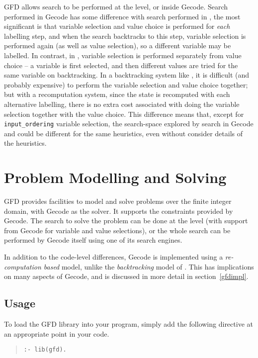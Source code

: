 GFD allows search to be performed at the \eclipse level, or inside Gecode. 
Search performed in Gecode has some difference with search performed in
\eclipse, the most significant is that variable selection and value choice is 
performed for 
{\it each\/} labelling step, and when the search backtracks to this step, 
variable selection is performed again (as well as value selection), 
so a different variable may be labelled. In contrast, in \eclipse, variable
selection is performed separately from value choice -- a variable is first
selected, and then different values are tried for the same variable on 
backtracking. In a backtracking system like \eclipse, it is 
difficult (and probably expensive) to perform the variable selection and 
value choice together; but with a recomputation system, since the state is
recomputed with each alternative labelling, there is no extra cost associated
with doing the variable selection together with the value choice. This 
difference means that, except for {\tt input_ordering} variable selection,
the search-space explored by search in Gecode and 
\eclipse could be different for the same heuristics, even without consider 
details of the heuristics. 

\section{Problem Modelling and Solving}

GFD provides facilities to model and solve problems over the 
finite integer domain, with Gecode as the solver. It supports the constraints
provided by Gecode. The search to solve the problem can be done at the 
\eclipse level (with support from Gecode for variable and value selections), 
or the whole search can be performed by Gecode itself using one of its 
search engines.   

In addition to the code-level differences, Gecode is implemented using a
{\it re-computation based\/} model, unlike the {\it backtracking\/}
 model of \eclipse. This has implications on many aspects of Gecode,
 and is discussed in more detail in section~\ref{gfdimpl}. 

\subsection{Usage}

To load the GFD library into your program, simply add the following directive
at an appropriate point in your code.

\begin{quote}
\begin{verbatim}
:- lib(gfd).
\end{verbatim}
\end{quote}

